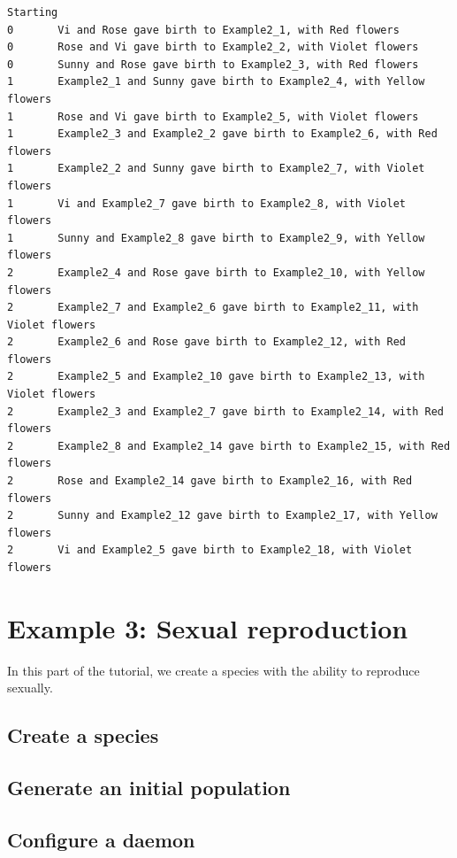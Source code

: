 \documentclass[a4paper,10pt]{report}
\begin{document}
\begin{itemize}
\begin{verbatim}
Starting
0       Vi and Rose gave birth to Example2_1, with Red flowers
0       Rose and Vi gave birth to Example2_2, with Violet flowers
0       Sunny and Rose gave birth to Example2_3, with Red flowers
1       Example2_1 and Sunny gave birth to Example2_4, with Yellow flowers
1       Rose and Vi gave birth to Example2_5, with Violet flowers
1       Example2_3 and Example2_2 gave birth to Example2_6, with Red flowers
1       Example2_2 and Sunny gave birth to Example2_7, with Violet flowers
1       Vi and Example2_7 gave birth to Example2_8, with Violet flowers
1       Sunny and Example2_8 gave birth to Example2_9, with Yellow flowers
2       Example2_4 and Rose gave birth to Example2_10, with Yellow flowers
2       Example2_7 and Example2_6 gave birth to Example2_11, with Violet flowers
2       Example2_6 and Rose gave birth to Example2_12, with Red flowers
2       Example2_5 and Example2_10 gave birth to Example2_13, with Violet flowers
2       Example2_3 and Example2_7 gave birth to Example2_14, with Red flowers
2       Example2_8 and Example2_14 gave birth to Example2_15, with Red flowers
2       Rose and Example2_14 gave birth to Example2_16, with Red flowers
2       Sunny and Example2_12 gave birth to Example2_17, with Yellow flowers
2       Vi and Example2_5 gave birth to Example2_18, with Violet flowers
\end{verbatim}

\chapter{Example 3: Sexual reproduction}
\label{sec:bug}

In this part of the tutorial, we create a species with the
ability to reproduce sexually.

\section{Create a species}
\label{sec:species3}



\section{Generate an initial population}
\label{sec:pop3}



\section{Configure a daemon}
\label{sec:daemon3}


\end{itemize}
\end{document}
